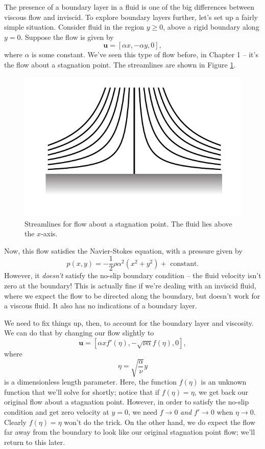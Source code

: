 The presence of a boundary layer in a fluid is one of the big differences between viscous flow and inviscid.  To explore boundary layers further, let's set up a fairly simple situation.  Consider fluid in the region $y \ge 0$, above a rigid boundary along $y=0$.  Suppose the flow is given by
\begin{equation}
\mathbf{u} = [\alpha x, -\alpha y, 0],
\end{equation}
where $\alpha$ is some constant.  We've seen this type of flow before, in Chapter 1 -- it's the flow about a stagnation point.  The streamlines are shown in Figure \ref{fig_boundary_stream}.

\begin{figure}
\centering
\includegraphics[width=0.6\linewidth]{Figures/Chapter2/fig_boundary_stream}
\caption{Streamlines for flow about a stagnation point.  The fluid lies above the $x$-axis.}
\label{fig_boundary_stream}
\end{figure}


Now, this flow satisfies the Navier-Stokes equation, with a pressure given by
\begin{equation}
\label{eq_boundary_pressure}
p(x, y) = -\frac{1}{2} \rho \alpha^2 ( x^2 + y^2) + \text{ constant}.
\end{equation}
However, it \emph{doesn't} satisfy the no-slip boundary condition -- the fluid velocity isn't zero at the boundary!  This is actually fine if we're dealing with an inviscid fluid, where we expect the flow to be directed along the boundary, but doesn't work for a viscous fluid.  It also has no indications of a boundary layer.

We need to fix things up, then, to account for the boundary layer and viscosity.  We can do that by changing our flow slightly to
\begin{equation}
\label{eq_boundary_trial}
\mathbf{u} = [\alpha x f'(\eta), -\sqrt{\nu \alpha} f(\eta), 0],
\end{equation}
where
\[
\eta = \sqrt{ \frac{\alpha}{\nu}} y
\]
is a dimensionless length parameter.  Here, the function $f(\eta)$ is an unknown function that we'll solve for shortly; notice that if $f(\eta) = \eta$, we get back our original flow about a stagnation point.  However, in order to satisfy the no-slip condition and get zero velocity at $y=0$, we need $f \to 0$ \emph{and} $f' \to 0$ when $\eta \to 0$.  Clearly $f(\eta) = \eta$ won't do the trick.  On the other hand, we do expect the flow far away from the boundary to look like our original stagnation point flow; we'll return to this later.

